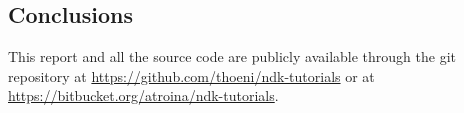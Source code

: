 \documentclass[a4paper,10pt]{article}
\begin{document}
\begin{multicols}{2}

\section{Conclusions}

This report and all the source code are publicly available through the git
repository at \url{https://github.com/thoeni/ndk-tutorials} or at
\url{https://bitbucket.org/atroina/ndk-tutorials}.

\nocite{liang1999jni}
\nocite{marakanajni}
\nocite{learningandroid}
\nocite{programmingandroid}




\end{multicols}
\end{document}
